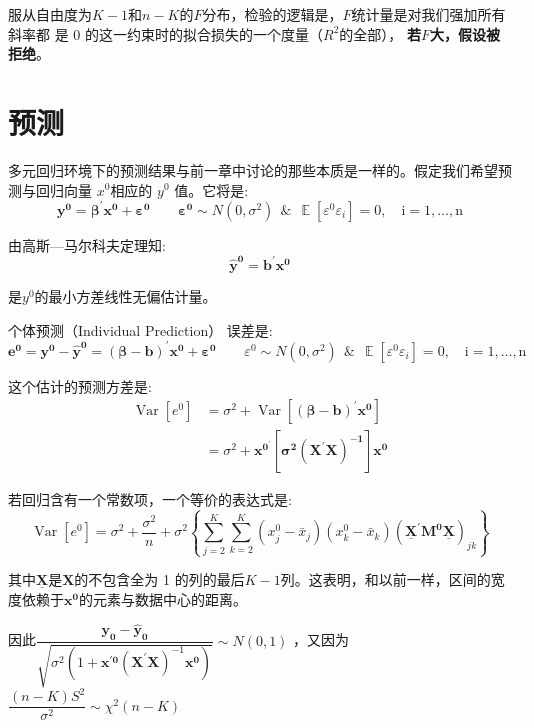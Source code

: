 服从自由度为$ K-1 $和$ n-K $的$ F $分布，检验的逻辑是，$ F $统计量是对我们强加所有斜率都
是 0 的这一约束时的拟合损失的一个度量（$ R^{2} $的全部）， {\bf 若$ F $大，假设被拒绝}。

\section{预测}

多元回归环境下的预测结果与前一章中讨论的那些本质是一样的。假定我们希望预测与回归向量 $ x^{0} $相应的 $ y^{0} $ 值。它将是:
$$ \boldsymbol{y^{0}= \beta^{\prime} x^{0}+\varepsilon^{0}} \qquad \boldsymbol{\varepsilon^{0}} \sim N\left(0, \sigma^{2}\right)  \ \ 
 \&  \ \ \operatorname{ \mathbb{E} } \left [  \varepsilon^{0} \varepsilon_{i} \right ]=0, \quad \mathrm{i}=1, \ldots, \mathrm{n} $$

由高斯—马尔科夫定理知:
$$ \boldsymbol{\hat{y}^{0}=b^{\prime} x^{0}} $$ 

是$ y^{0} $的最小方差线性无偏估计量。

{\heiti 个体预测（Individual Prediction）} 误差是:
$$ \boldsymbol{e^{0}=y^{0}-\hat{y}^{0}=(\beta-b)^{\prime} x^{0}+\varepsilon^{0}} \qquad \varepsilon^{0} \sim N\left(0, \sigma^{2}\right)  \ \ 
\&  \ \ \operatorname{\mathbb{E}} \left [  \varepsilon^{0} \varepsilon_{i} \right ]=0, \quad \mathrm{i}=1, \ldots, \mathrm{n} $$

这个估计的预测方差是:
$$ \begin{aligned}
    \operatorname{Var}\left[e^{0}\right] &=\sigma^{2}+\operatorname{Var}\left[\boldsymbol{(\beta-b)^{\prime} x^{0}}\right] \\
    & = \sigma^{2} + \boldsymbol{x^{0^{\prime}}\left[\sigma^{2}\left( \boldsymbol{X^{\prime} X}\right)^{-1}\right] \boldsymbol{x^{0}}}
   \end{aligned} $$

若回归含有一个常数项，一个等价的表达式是:
$$ \operatorname{Var}\left[e^{0}\right]=\sigma^{2}+\frac{\sigma^{2}}{n}+\sigma^{2}\left\{\sum_{j=2}^{K} 
    \sum_{k=2}^{K}\left(x_{j}^{0}-\bar{x}_{j}\right)\left(x_{k}^{0}-\bar{x}_{k}\right)
    \left( \boldsymbol{\underline{X}^{\prime} M^{0} \underline{X}} \right)_{j k}\right\} $$

其中$ \boldsymbol{\underline{ X }} $是$ \boldsymbol{X} $的不包含全为 1 的列的最后$ K-1 $列。这表明，和以前一样，区间的宽度依赖于$ \boldsymbol{x^{0}} $的元素与数据中心的距离。

因此$ \dfrac{\boldsymbol{y_{0}-\hat{y}_{0}}}
{\sqrt{\sigma^{2}\left(1+\boldsymbol{x^{\prime 0}}\left(\boldsymbol{X^{\prime} X}\right)^{-1} \boldsymbol{x^{0}}\right)}} \sim N(0,1) $ ，又因为
$ \dfrac{(n-K) S^{2}}{\sigma^{2}} \sim \chi^{2}(n-K) $

